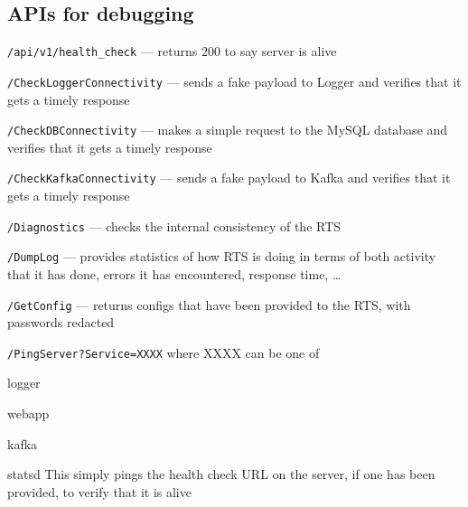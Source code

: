 \documentclass[letterpaper]{article}
\begin{document}
\subsection{APIs for debugging}

\be
\item {\tt /api/v1/health\_check} --- returns 200 to say server is alive
\item {\tt /CheckLoggerConnectivity} --- sends a fake payload to Logger and
  verifies that it gets a timely response
\item {\tt /CheckDBConnectivity} --- makes a simple request to the MySQL
  database and verifies that it gets a timely response
\item {\tt /CheckKafkaConnectivity} --- sends a fake payload to Kafka and
  verifies that it gets a timely response
\item {\tt /Diagnostics} --- checks the internal consistency of the RTS
\item {\tt /DumpLog} --- provides statistics of how RTS is doing in terms of
  both activity that it has done, errors it has encountered, response time,
  \ldots
\item {\tt /GetConfig} --- returns configs that have been provided to the
  RTS, with passwords redacted
\item {\tt /PingServer?Service=XXXX} where XXXX can be one of 
  \be
\item logger
\item webapp
\item kafka 
\item statsd 
  \ee
  This simply pings the health check URL on the server, if one has been
  provided, to verify that it is alive
  \ee
\end{document}
